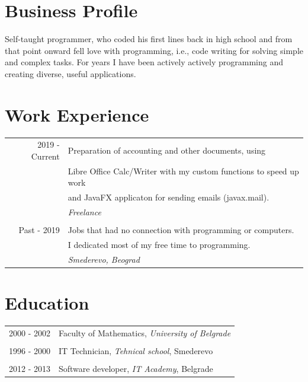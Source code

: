 \documentclass[a4paper,11pt]{article}
\begin{document}
{  \section*{Business Profile}
  
Self-taught programmer, who coded his first lines back in high school and from that point onward fell love with programming, i.e., code writing for solving simple and complex tasks. For years I have been actively actively programming and creating diverse, useful applications.
  
  \section*{Work Experience}
  
  \begin{tabular}{r|l}
    2019 - Current  & Preparation of accounting and other documents, using\\ 
                     & Libre Office Calc/Writer with my custom functions to speed up work\\
                     & and JavaFX applicaton for sending emails (javax.mail).\\
                     & \emph{Freelance}\\
    \multicolumn{2}{c}{} \\
    Past - 2019 & Jobs that had no connection with programming or computers.\\
                     & I dedicated most of my free time to programming.\\
                     & \emph{Smederevo, Beograd}\\
  \end{tabular}
  
  \section*{Education}
  
  \begin{tabular}{r|l}
    2000 - 2002 & Faculty of Mathematics, \emph{University of Belgrade}\\
    \multicolumn{2}{c}{} \\
    1996 - 2000 & IT Technician, \emph{Tehnical school}, Smederevo\\
    \multicolumn{2}{c}{} \\
    2012 - 2013 & Software developer, \emph{IT Academy}, Belgrade\\ 
  \end{tabular}
  
}
\end{document}
